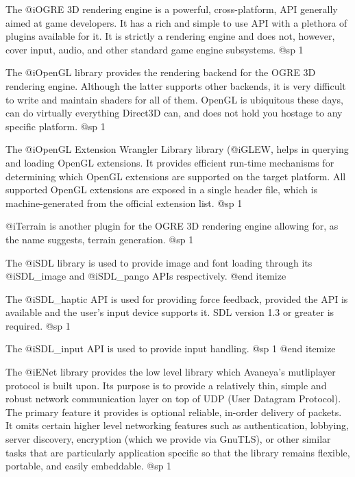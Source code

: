 \item
The @i{OGRE 3D} rendering engine is a powerful, cross-platform, API generally aimed at game developers. It has a rich and simple to use API with a plethora of plugins available for it. It is strictly a rendering engine and does not, however, cover input, audio, and other standard game engine subsystems.
@sp 1

\item
The @i{OpenGL} library provides the rendering backend for the OGRE 3D rendering engine. Although the latter supports other backends, it is very difficult to write and maintain shaders for all of them. OpenGL is ubiquitous these days, can do virtually everything Direct3D can, and does not hold you hostage to any specific platform.
@sp 1

\item
The @i{OpenGL Extension Wrangler Library} library (@i{GLEW}, helps in querying and loading OpenGL extensions. It provides efficient run-time mechanisms for determining which OpenGL extensions are supported on the target platform. All supported OpenGL extensions are exposed in a single header file, which is machine-generated from the official extension list.
@sp 1

\item
@i{Terrain} is another plugin for the OGRE 3D rendering engine allowing for, as the name suggests, terrain generation.
@sp 1

\item
The @i{SDL} library is used to provide image and font loading through its @i{SDL_image} and @i{SDL_pango} APIs respectively.
@end itemize


\itemize
\item
The @i{SDL_haptic} API is used for providing force feedback, provided the API is available and the user's input device supports it. SDL version 1.3 or greater is required.
@sp 1

\item
The @i{SDL_input} API is used to provide input handling.
@sp 1
@end itemize


\itemize
\item
The @i{ENet} library provides the low level library which Avaneya's mutliplayer protocol is built upon. Its purpose is to provide a relatively thin, simple and robust network communication layer on top of UDP (User Datagram Protocol). The primary feature it provides is optional reliable, in-order delivery of packets. It omits certain higher level networking features such as authentication, lobbying, server discovery, encryption (which we provide via GnuTLS), or other similar tasks that are particularly application specific so that the library remains flexible, portable, and easily embeddable.
@sp 1


